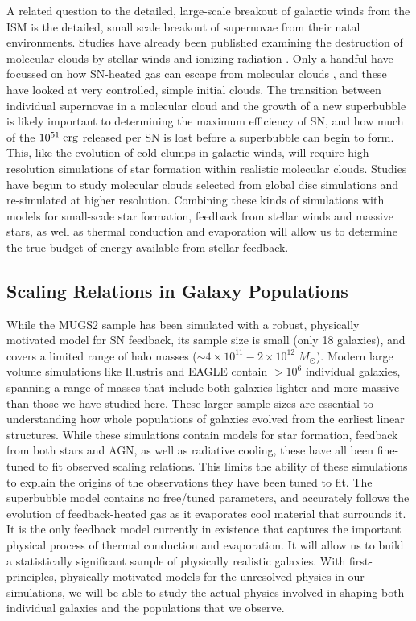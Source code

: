A related question to the detailed, large-scale breakout of galactic winds from
the ISM is the detailed, small scale breakout of supernovae from their natal
environments.  Studies have already been published examining the destruction of
molecular clouds by stellar winds and ionizing radiation
\citep{Murray2010,Walch2012}.  Only a handful have focussed on how SN-heated gas
can escape from molecular clouds \citep{Rogers2013}, and these have looked at
very controlled, simple initial clouds.  The transition between individual
supernovae in a molecular cloud and the growth of a new superbubble is likely
important to determining the maximum efficiency of SN, and how much 
of the $10^{51}\;\rm{erg}$ released per SN is lost before a superbubble can begin
to form.  This, like the evolution of cold clumps in galactic winds, will
require high-resolution simulations of star formation within realistic molecular
clouds.  Studies have begun \citep{Dobbs2015} to study molecular clouds selected
from global disc simulations and re-simulated at higher resolution.  Combining
these kinds of simulations with models for small-scale star formation, feedback
from stellar winds and massive stars, as well as thermal conduction and
evaporation will allow us to determine the true budget of energy available from
stellar feedback.

\subsection{Scaling Relations in Galaxy Populations}
While the MUGS2 sample has been simulated with a robust, physically motivated
model for SN feedback, its sample size is small (only 18 galaxies), and covers a
limited range of halo masses ($\sim 4\times10^{11}-2\times10^{12}\;M_\odot$).
Modern large volume simulations like Illustris \citep{Vogelsberger2014b} and
EAGLE \citep{Schaye2015} contain $>10^6$ individual galaxies, spanning a range
of masses that include both galaxies lighter and more massive than those we have
studied here.  These larger sample sizes are essential to understanding how
whole populations of galaxies evolved from the earliest linear structures.
While these simulations contain models for star formation, feedback from both
stars and AGN, as well as radiative cooling, these have all been fine-tuned to
fit observed scaling relations.  This limits the ability of these simulations to
explain the origins of the observations they have been tuned to fit.  The
superbubble model contains no free/tuned parameters, and accurately follows the
evolution of feedback-heated gas as it evaporates cool material that surrounds
it.  It is the only feedback model currently in existence that captures the
important physical process of thermal conduction and evaporation.  It will allow
us to build a statistically significant sample of physically realistic galaxies.
With first-principles, physically motivated models for the unresolved physics in
our simulations, we will be able to study the actual physics involved in shaping
both individual galaxies and the populations that we observe. 

